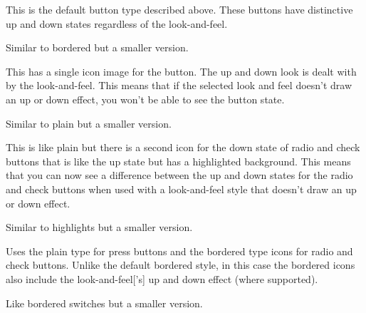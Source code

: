 \begin{deflist}

\begin{itemdesc}
This is the default button type described above.
These buttons have distinctive up and down states regardless of the
\gls{look-and-feel}.
\end{itemdesc}


\begin{itemdesc}
Similar to bordered but a smaller version.
\end{itemdesc}


\begin{itemdesc}
This has a single icon image for the button. The up and
down look is dealt with by the \gls{look-and-feel}. This means that if the
selected look and feel doesn't draw an up or down effect, you won't
be able to see the button state.
\end{itemdesc}


\begin{itemdesc}
Similar to plain but a smaller version.
\end{itemdesc}


\begin{itemdesc}
This is like plain but there is a
second icon for the down state of radio and check buttons that is
like the up state but has a highlighted background. This means that
you can now see a difference between the up and down states for the
radio and check buttons when used with a \gls{look-and-feel} style that
doesn't draw an up or down effect.
\end{itemdesc}


\begin{itemdesc}
Similar to highlights but a smaller version.
\end{itemdesc}


\begin{itemdesc}
Uses the plain type for press buttons and
the bordered type icons for radio and check buttons. Unlike the
default bordered style, in this case the bordered icons also include
the \gls{look-and-feel}['s] up and down effect (where supported).
\end{itemdesc}


\begin{itemdesc}
Like bordered switches but a smaller version.
\end{itemdesc}

\end{deflist}

